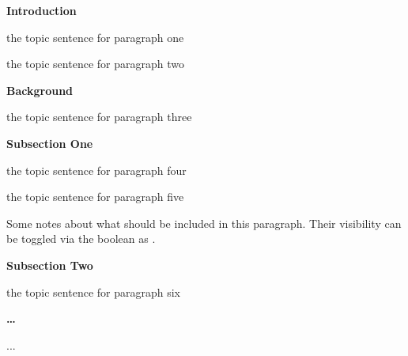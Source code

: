 \begin{paragraphs}
    \item[\head] \textbf{Introduction}
    \begin{paragraphs}
        \item[\done]  the topic sentence for paragraph one
        \item[\done]  the topic sentence for paragraph two
    \end{paragraphs}

    \item[\head] \textbf{Background}
    \begin{paragraphs}
        \item[\look]  the topic sentence for paragraph three

        \item[\head] \textbf{Subsection One}
        \begin{paragraphs}
            \item[\done]  the topic sentence for paragraph four
            \item {} the topic sentence for paragraph five
            \begin{notes}
                \item Some notes about what should be included in this
                    paragraph. Their visibility can be toggled via the
                     boolean as .
                    \lipsum[7][1-5]
            \end{notes}
        \end{paragraphs}

        \item[\head] \textbf{Subsection Two}
        \begin{paragraphs}
            \item[\done]  the topic sentence for paragraph six
        \end{paragraphs}
    \end{paragraphs}

    \item[\head] \textbf{\dots}
    \begin{paragraphs}
        \item ...
    \end{paragraphs}
\end{paragraphs}

\normalsize
